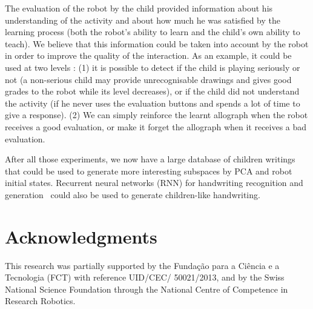 \documentclass{sig-alternate}
\begin{document}
The evaluation of the robot by the child provided information about his
understanding of the activity and about how much he was satisfied by the
learning process (both the robot's ability to learn and the child's own
ability to teach). We believe that this information could be taken into account by
the robot in order to improve the quality of the interaction. As an example, it
could be used at two levels : (1) it is possible to detect if the child is playing
seriously or not (a non-serious child may provide unrecognisable drawings and gives good grades to
the robot while its level decreases), or if the child did not understand the
activity (if he never uses the evaluation buttons and spends a lot of time to
give a response). (2) We can simply reinforce the learnt allograph when the robot
receives a good evaluation, or make it forget the allograph when it
receives a bad evaluation.

After all those
experiments, we now have a large database of children writings that could be
used to generate more interesting subspaces by PCA and robot initial states. 
Recurrent neural networks (RNN) for handwriting recognition and generation~\cite{DBLP:journals/corr/Graves13} could also be used to generate 
children-like handwriting.

\section*{Acknowledgments}

This research was partially supported by the Funda\c{c}\~{a}o para a Ci\^{e}ncia
e a Tecnologia (FCT) with reference UID/CEC/ 50021/2013, and by the Swiss
National Science Foundation through the National Centre of Competence in
Research Robotics.



 
\end{document}
